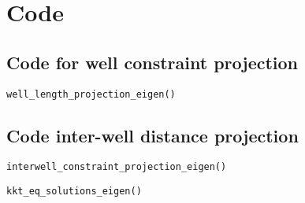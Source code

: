 %
\chapter{Code}

\section{Code for well constraint projection}
%
\texttt{well\_length\_projection\_eigen()}

%
\section{Code inter-well distance projection}
%
\texttt{interwell\_constraint\_projection\_eigen()}

%
\texttt{kkt\_eq\_solutions\_eigen()}

%